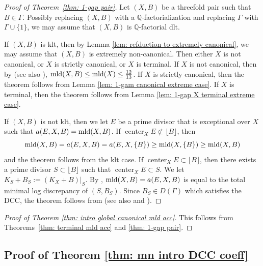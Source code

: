 \documentclass[11pt]{amsart}
\numberwithin{equation}{section}
\newcommand{\Qq}{\mathbb{Q}}
\newcommand{\Center}{\operatorname{center}}
\newcommand{\mld}{{\rm{mld}}}
\newcommand{\Ii}{{\Gamma}}
\theoremstyle{definition}
\theoremstyle{definition}
\begin{document}
\begin{proof}[Proof of Theorem~\ref{thm: 1-gap pair}]
Let $(X,B)$ be a threefold pair such that $B\in \Ii$. Possibly replacing $(X,B)$ with a $\Qq$-factorialization and replacing $\Ii$ with $\Ii\cup\{1\}$, we may assume that $(X,B)$ is $\Qq$-factorial dlt. 

If $(X,B)$ is klt, then by Lemma \ref{lem: refduction to extremely canonical}, we may assume that $(X,B)$ is extremely non-canonical. Then either $X$ is not canonical, or $X$ is strictly canonical, or $X$ is terminal. If $X$ is not canonical, then by \cite[Theorem 1.4]{LX21} (see also \cite[Theorem 1.3]{Jia21}), $\mld(X,B)\leq\mld(X)\leq\frac{12}{13}$. If $X$ is strictly canonical, then the theorem follows from Lemma \ref{lem: 1-gam canonical extreme case}. If $X$ is terminal, then the theorem follows from Lemma \ref{lem: 1-gap X terminal extreme case}.

If $(X,B)$ is not klt, then we let $E$ be a prime divisor that is exceptional over $X$ such that $a(E,X,B)=\mld(X,B)$. If $\Center_XE\not\subset\lfloor B\rfloor$, then $$\mld(X,B)=a(E,X,B)=a(E,X,\{B\})\geq\mld(X,\{B\})\geq\mld(X,B)$$
and the theorem follows from the klt case. If $\Center_XE\subset\lfloor B\rfloor$, then there exists a prime divisor $S\subset\lfloor B\rfloor$ such that $\Center_XE\subset S$. We let $K_S+B_S:=(K_X+B)|_S$. By \cite[Corollary 1.4.5]{BCHM10}, $\mld(X,B)=a(E,X,B)$ is equal to the total minimal log discrepancy of $(S,B_S)$. Since $B_S\in D(\Ii)$ which satisfies the DCC, the theorem follows from \cite[Theorem 3.8]{Ale93} (see also \cite{Sho04b} and \cite[Theorem 1.5]{HL20}).
\end{proof}


\begin{proof}[Proof of Theorem \ref{thm: intro global canonical mld acc}]
This follows from Theorems~\ref{thm:  terminal mld acc} and \ref{thm: 1-gap pair}.
\end{proof}


\subsection{Proof of Theorem \ref{thm: mn intro DCC coeff}}
\end{document}
